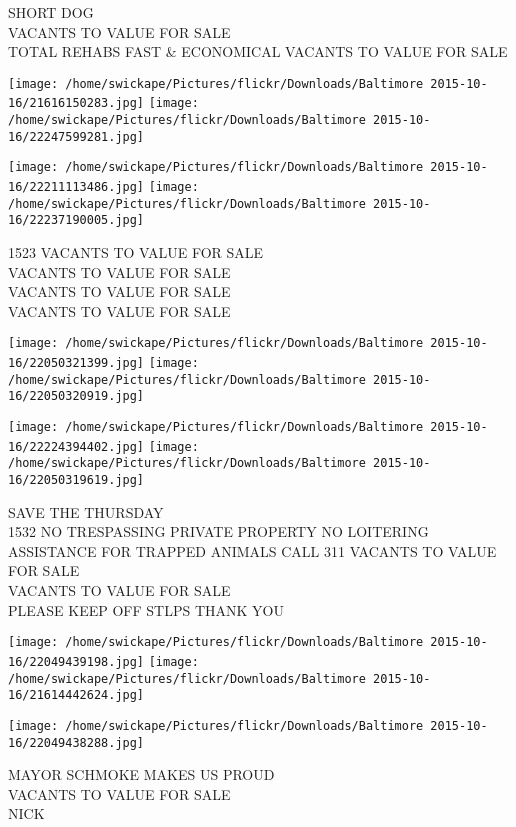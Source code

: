 \documentclass[10pt,letterpaper]{article}
\begin{document}
SHORT DOG\\
VACANTS TO VALUE FOR SALE\\
TOTAL REHABS FAST \& ECONOMICAL VACANTS TO VALUE FOR SALE
\pagebreak

\texttt{[image: /home/swickape/Pictures/flickr/Downloads/Baltimore 2015-10-16/21616150283.jpg]}
\texttt{[image: /home/swickape/Pictures/flickr/Downloads/Baltimore 2015-10-16/22247599281.jpg]}

\texttt{[image: /home/swickape/Pictures/flickr/Downloads/Baltimore 2015-10-16/22211113486.jpg]}
\texttt{[image: /home/swickape/Pictures/flickr/Downloads/Baltimore 2015-10-16/22237190005.jpg]}

1523 VACANTS TO VALUE FOR SALE\\
VACANTS TO VALUE FOR SALE\\
VACANTS TO VALUE FOR SALE\\
VACANTS TO VALUE FOR SALE
\pagebreak

\texttt{[image: /home/swickape/Pictures/flickr/Downloads/Baltimore 2015-10-16/22050321399.jpg]}
\texttt{[image: /home/swickape/Pictures/flickr/Downloads/Baltimore 2015-10-16/22050320919.jpg]}

\texttt{[image: /home/swickape/Pictures/flickr/Downloads/Baltimore 2015-10-16/22224394402.jpg]}
\texttt{[image: /home/swickape/Pictures/flickr/Downloads/Baltimore 2015-10-16/22050319619.jpg]}

SAVE THE THURSDAY\\
1532 NO TRESPASSING PRIVATE PROPERTY NO LOITERING ASSISTANCE FOR TRAPPED ANIMALS CALL 311 VACANTS TO VALUE FOR SALE\\
VACANTS TO VALUE FOR SALE\\
PLEASE KEEP OFF STLPS THANK YOU
\pagebreak

\texttt{[image: /home/swickape/Pictures/flickr/Downloads/Baltimore 2015-10-16/22049439198.jpg]}
\texttt{[image: /home/swickape/Pictures/flickr/Downloads/Baltimore 2015-10-16/21614442624.jpg]}

\vspace{0.25in}
\texttt{[image: /home/swickape/Pictures/flickr/Downloads/Baltimore 2015-10-16/22049438288.jpg]}

MAYOR SCHMOKE MAKES US PROUD\\
VACANTS TO VALUE FOR SALE\\
NICK
\pagebreak
\end{document}
